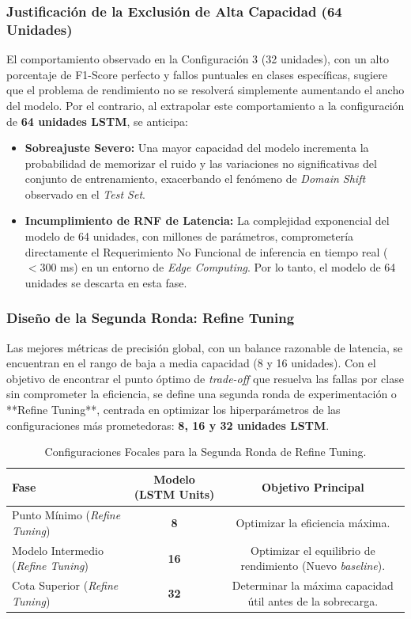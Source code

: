 \subsubsection{Justificación de la Exclusión de Alta Capacidad (64 Unidades)}

El comportamiento observado en la Configuración 3 (32 unidades), con un alto porcentaje de F1-Score perfecto y fallos puntuales en clases específicas, sugiere que el problema de rendimiento no se resolverá simplemente aumentando el ancho del modelo. Por el contrario, al extrapolar este comportamiento a la configuración de \textbf{64 unidades LSTM}, se anticipa:

\begin{itemize}
    \item \textbf{Sobreajuste Severo:} Una mayor capacidad del modelo incrementa la probabilidad de memorizar el ruido y las variaciones no significativas del conjunto de entrenamiento, exacerbando el fenómeno de \textit{Domain Shift} observado en el \textit{Test Set}.
    \item \textbf{Incumplimiento de RNF de Latencia:} La complejidad exponencial del modelo de 64 unidades, con millones de parámetros, comprometería directamente el Requerimiento No Funcional de inferencia en tiempo real ($<300$ ms) en un entorno de \textit{Edge Computing}. Por lo tanto, el modelo de 64 unidades se descarta en esta fase.
\end{itemize}

\subsubsection{Diseño de la Segunda Ronda: Refine Tuning}

Las mejores métricas de precisión global, con un balance razonable de latencia, se encuentran en el rango de baja a media capacidad (8 y 16 unidades). Con el objetivo de encontrar el punto óptimo de \textit{trade-off} que resuelva las fallas por clase sin comprometer la eficiencia, se define una segunda ronda de experimentación o **Refine Tuning**, centrada en optimizar los hiperparámetros de las configuraciones más prometedoras: \textbf{8, 16 y 32 unidades LSTM}.

\begin{table}[H]
    \centering
    \footnotesize
    \setlength{\tabcolsep}{4pt}
    \caption{Configuraciones Focales para la Segunda Ronda de Refine Tuning.}
    \label{tab:refine_tuning}
    \begin{tabular}{|l|c|c|}
        \hline
        \textbf{Fase} & \textbf{Modelo (LSTM Units)} & \textbf{Objetivo Principal} \\
        \hline
        Punto Mínimo (\textit{Refine Tuning}) & \textbf{8} & Optimizar la eficiencia máxima. \\
        Modelo Intermedio (\textit{Refine Tuning}) & \textbf{16} & Optimizar el equilibrio de rendimiento (Nuevo \textit{baseline}). \\
        Cota Superior (\textit{Refine Tuning}) & \textbf{32} & Determinar la máxima capacidad útil antes de la sobrecarga. \\
        \hline
    \end{tabular}
\end{table}


